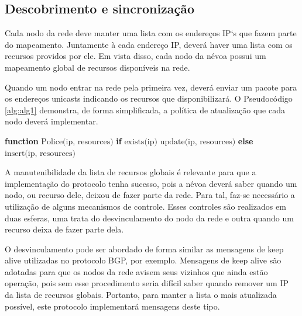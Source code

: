 \subsection{Descobrimento e sincronização}

Cada nodo da rede deve manter uma lista com os endereços IP`s que fazem parte do mapeamento. Juntamente à cada endereço IP, deverá haver uma lista com os recursos providos por ele.
Em vista disso, cada nodo da névoa possui um mapeamento global de recursos disponíveis na rede.

Quando um nodo entrar na rede pela primeira vez, deverá enviar um pacote para os endereços unicasts indicando os recursos que disponibilizará.
O Pseudocódigo \ref{alg:alg1} demonstra, de forma simplificada, a política de atualização que cada nodo deverá implementar.


\begin{algorithm}[htb]
    \begin{center}
        \begin{algorithmic}[1]
            \STATE \textbf{function} $\text{Police(ip, resources)}$
            \STATE \hspace{\algorithmicindent} \textbf{if} $\text{exists(ip)}$
            \STATE \hspace{\algorithmicindent} \hspace{\algorithmicindent} $\text{update(ip, resources)}$
            \STATE \hspace{\algorithmicindent} \textbf{else}
            \STATE \hspace{\algorithmicindent} \hspace{\algorithmicindent} $\text{insert(ip, resources)}$
        \end{algorithmic}
    \end{center}
    \caption[Política de atualização de recursos]%
        {\label{alg:alg1} Política de atualização de recursos.}%
    \end{algorithm}



A manutenibilidade da lista de recursos globais é relevante para que a implementação do protocolo tenha sucesso, pois a névoa deverá saber quando um nodo, ou recurso dele, deixou de fazer parte da rede.
Para tal, faz-se necessário a utilização de alguns mecanismos de controle.
Esses controles são realizados em duas esferas, uma trata do desvinculamento do nodo da rede e outra quando um recurso deixa de fazer parte dela.

O desvinculamento pode ser abordado de forma similar as mensagens de keep alive utilizadas no protocolo BGP, por exemplo.
Mensagens de keep alive são adotadas para que os nodos da rede avisem seus vizinhos que ainda estão operação, pois sem esse procedimento seria difícil
saber quando remover um IP da lista de recursos globais. Portanto, para manter a lista o mais atualizada possível, este protocolo implementará mensagens deste tipo.


